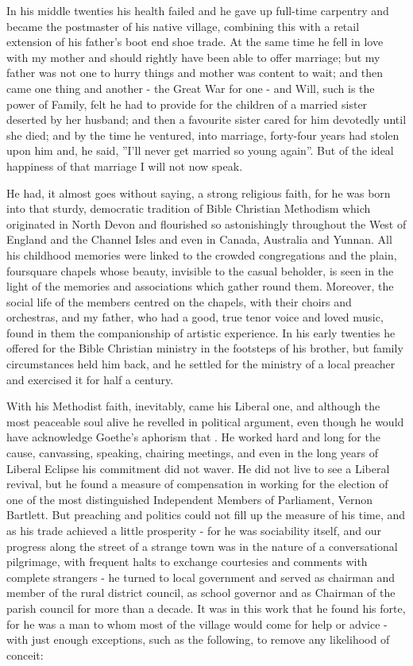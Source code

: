 In his middle twenties his health failed and he gave up full-time carpentry and became the postmaster of his native village, combining this with a retail extension of his father’s boot end shoe trade. At the same time he fell in love with my mother and should rightly have been able to offer marriage; but my father was not one to hurry things and mother was content to wait; and then came one thing and another - the Great War for one - and Will, such is the power of Family, felt he had to provide for the children of a married sister deserted by her husband; and then a favourite sister cared for him devotedly until she died; and by the time he ventured, into marriage, forty-four years had stolen upon him and, he said, ”I’ll never get married so young again”. But of the ideal happiness of that marriage I will not now speak.

He had, it almost goes without saying, a strong religious faith, for he was born into that sturdy, democratic tradition of Bible Christian Methodism which originated in North Devon and flourished so astonishingly throughout the West of England and the Channel Isles and even in Canada, Australia and Yunnan. All his childhood memories were linked to the crowded congregations and the plain, foursquare chapels whose beauty, invisible to the casual beholder, is seen in the light of the memories and associations which gather round them. Moreover, the social life of the members centred on the chapels, with their choirs and orchestras, and my father, who had a good, true tenor voice and loved music, found in them the companionship of artistic experience. In his early twenties he offered for the Bible Christian ministry in the footsteps of his brother, but family circumstances held him back, and he settled for the ministry of a local preacher and exercised it for half a century.


With his Methodist faith, inevitably, came his Liberal one, and although the most peaceable soul alive he revelled in political argument, even though he would have acknowledge Goethe’s aphorism that . He worked hard and long for the cause, canvassing, speaking, chairing meetings, and even in the long years of Liberal Eclipse his commitment did not waver. He did not live to see a Liberal revival, but he found a measure of compensation in working for the election of one of the most distinguished Independent Members of Parliament, Vernon Bartlett. But preaching and politics could not fill up the measure of his time, and as his trade achieved a little prosperity - for he was sociability itself, and our progress along the street of a strange town was in the nature of a conversational pilgrimage, with frequent halts to exchange courtesies and comments with complete strangers - he turned to local government and served as chairman and member of the rural district council, as school governor and as Chairman of the parish council for more than a decade. It was in this work that he found his forte, for he was a man to whom most of the village would come for help or advice - with just enough exceptions, such as the following, to remove any likelihood of conceit:

